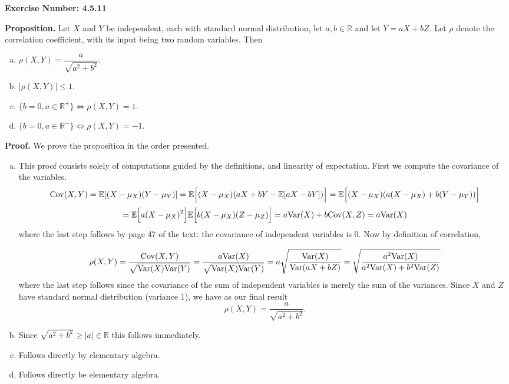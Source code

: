 \documentclass{article}
\begin{document}
\newcommand{\E}{\mathbb{E}}

\newcommand{\Var}{\bold{\operatorname{Var}}}

\newcommand{\Cov}{\bold{\operatorname{Cov}}}

\noindent \textbf{Exercise Number: 4.5.11}  %

\medskip 

\noindent \textbf{Proposition.}  Let $X$ and $Y$ be independent, each with standard normal distribution, let $a,b \in \mathbb{R}$ and let $Y = aX + bZ$. Let $\rho$ denote the correlation coefficient, with its input being two random variables. Then  

\begin{enumerate}[a.]

\item $\rho(X,Y) = \dfrac{a}{\sqrt{a^2 + b^2}}$.  

\item $|\rho(X,Y)| \leq 1$. 

\item $\Big\{b = 0, a \in \mathbb{R}^+\} \Longleftrightarrow \rho(X,Y) = 1$. 

\item $\Big\{b = 0, a \in \mathbb{R}^- \} \Longleftrightarrow \rho(X,Y) = -1$.

\end{enumerate}

\bigskip

\noindent \textbf{Proof.} We prove the proposition in the order presented. 

\begin{enumerate}[a.]

\item This proof consists solely of computations guided by the definitions, and linearity of expectation. First we compute the covariance of the variables. \[\Cov(X,Y) = \E[(X - \mu_X) (Y - \mu_Y)]  = \E\Big[(X - \mu_X) (aX + bY - \E[aX - bY])\Big] = \E\Big[(X - \mu_X) (a(X - \mu_X) + b(Y - \mu_Y))\Big] \] \[ = \E\Big[a(X - \mu_X)^2\Big] \E\Big[b (X - \mu_X)(Z - \mu_Z)\Big] = a\Var(X) + b \Cov(X,Z) = a\Var(X) \] where the last step follows by page 47 of the text: the covariance of independent variables is 0. Now by definition of correlation, 

\[\rho(X,Y) = \dfrac{\Cov(X,Y)}{\sqrt{\Var(X) \Var(Y)}} = \dfrac{a\Var(X)}{\sqrt{\Var(X) \Var(Y)}}  = a\sqrt{\dfrac{\Var(X)}{\Var(aX + bZ)}} = \sqrt{\dfrac{a^2\Var(X)}{a^2\Var(X) + b^2\Var(Z)}}\] where the last step follows since the covariance of the sum of independent variables is merely the sum of the variances. Since $X$ and $Z$ have standard normal distribution (variance 1), we have as our final result \[\rho(X,Y) = \dfrac{a}{\sqrt{a^2 + b^2}}.\]

\item Since $\sqrt{a^2 + b^2} \geq |a| \in \mathbb{R}$ this follows immediately. 

\item Follows directly by elementary algebra.

\item Follows directly be elementary algebra. 

\end{enumerate}
\end{document}
